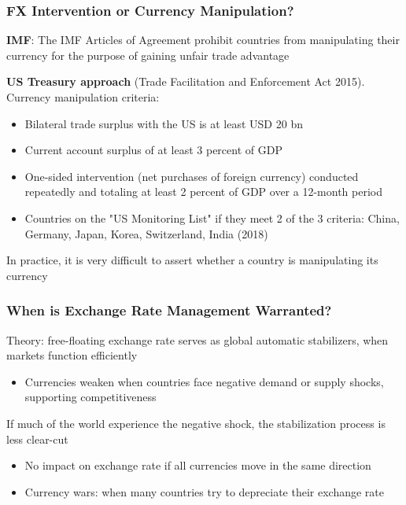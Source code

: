 \documentclass{beamer}
\newenvironment{wideitemize}{\itemize\addtolength{\itemsep}{10pt}}{\enditemize}
\begin{document}
\begin{frame}
  \frametitle{FX Intervention or Currency Manipulation?}
  \begin{wideitemize}
    \item \textbf{IMF}: The IMF Articles of Agreement prohibit countries from manipulating their currency for the purpose of gaining unfair trade advantage
    \item \textbf{US Treasury approach} (Trade Facilitation and Enforcement Act 2015). Currency manipulation criteria:
      \begin{itemize}
      \item Bilateral trade surplus with the US is at least USD 20 bn
      \item Current account surplus of at least 3 percent of GDP
      \item One-sided intervention (net purchases of foreign currency) conducted repeatedly and totaling at least 2 percent of GDP over a 12-month period
      \item Countries on the "US Monitoring List" if they meet 2 of the 3 criteria: China, Germany, Japan, Korea, Switzerland, India (2018)
      \end{itemize}
  \item In practice, it is very difficult to assert whether a country is manipulating its currency
  \end{wideitemize}  
\end{frame}


\begin{frame}
  \frametitle{When is Exchange Rate Management Warranted?}
  \begin{wideitemize}
    \item Theory: free-floating exchange rate serves as global automatic stabilizers, when markets function efficiently
      \begin{itemize}
      \item Currencies weaken when countries face negative demand or supply shocks, supporting competitiveness
      \end{itemize}
  \item If much of the world experience the negative shock, the stabilization process is less clear-cut
    \begin{itemize}
    \item No impact on exchange rate if all currencies move in the same direction
    \item Currency wars: when many countries try to depreciate their exchange rate
    \end{itemize}
  \end{wideitemize}
\end{frame}
\end{document}

